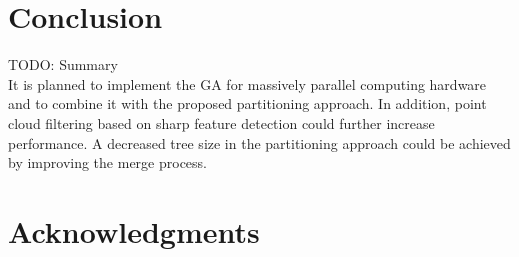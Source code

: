 \section{Conclusion}
TODO: Summary
\\
It is planned to implement the \ac{GA} for massively parallel computing hardware and to combine it with the proposed partitioning approach. 
In addition, point cloud filtering based on sharp feature detection \cite{weber2010sharp} could further increase performance.
A decreased tree size in the partitioning approach could be achieved by improving the merge process.



\section{Acknowledgments}



%
%

